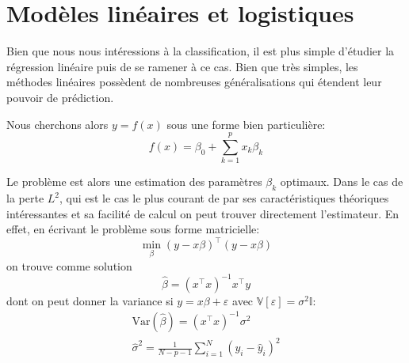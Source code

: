 

\section{Modèles linéaires et logistiques}

Bien que nous nous intéressions à la classification, il est plus simple d'étudier la régression linéaire puis de se ramener à ce cas. Bien que très simples, les méthodes linéaires possèdent de nombreuses généralisations qui étendent leur pouvoir de prédiction.

Nous cherchons alors $y = f(x)$ sous une forme bien particulière:
\begin{equation*}
    f(x) = \beta_0 + \sum_{k=1}^p x_k \beta_k
\end{equation*}

Le problème est alors une estimation des paramètres $\beta_k$ optimaux. Dans le cas de la perte $L^2$, qui est le cas le plus courant de par ses caractéristiques théoriques intéressantes et sa facilité de calcul on peut trouver directement l'estimateur. En effet, en écrivant le problème sous forme matricielle:
\begin{equation*}
    \min_\beta (y-x\beta)^\intercal(y-x\beta)
\end{equation*}
on trouve comme solution
\begin{equation*}
    \hat{\beta} = (x^\intercal x)^{-1} x^\intercal y
\end{equation*}
dont on peut donner la variance si $y = x\beta + \varepsilon$ avec $\mathbb{V} \left[ \varepsilon \right] = \sigma^2 \mathds{I}$:
\begin{gather*}
    \mathrm{Var} ( \hat{\beta} ) = (x^\intercal x)^{-1} \sigma^2 \label{equ:var.beta} \\
    \hat{\sigma}^2 = \frac{1}{N-p-1} \sum_{i=1}^N (y_i - \hat{y}_i)^2
\end{gather*}

